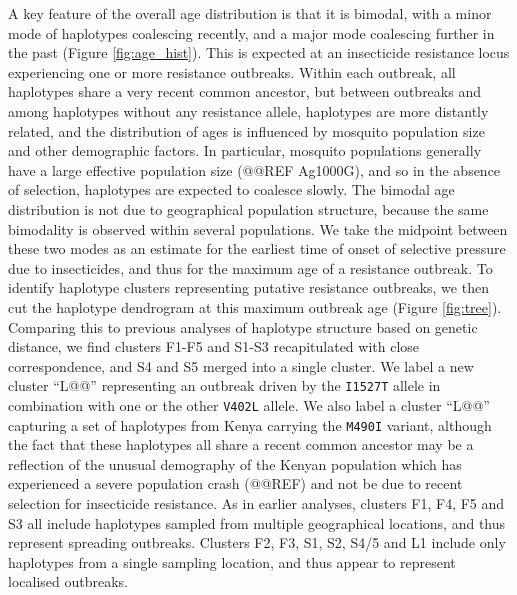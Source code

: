 \documentclass[a4paper,11pt,abstracton,hidelinks]{scrartcl}
\begin{document}
%
A key feature of the overall age distribution is that it is bimodal, with a minor mode of haplotypes coalescing recently, and a major mode coalescing further in the past (Figure \ref{fig:age_hist}).
%
This is expected at an insecticide resistance locus experiencing one or more resistance outbreaks.
%
Within each outbreak, all haplotypes share a very recent common ancestor, but between outbreaks and among haplotypes without any resistance allele, haplotypes are more distantly related, and the distribution of ages is influenced by mosquito population size and other demographic factors.
%
In particular, mosquito populations generally have a large effective population size (@@REF Ag1000G), and so in the absence of selection, haplotypes are expected to coalesce slowly.
%
The bimodal age distribution is not due to geographical population structure, because the same bimodality is observed within several populations.
%
We take the midpoint between these two modes as an estimate for the earliest time of onset of selective pressure due to insecticides, and thus for the maximum age of a resistance outbreak.
%
To identify haplotype clusters representing putative resistance outbreaks, we then cut the haplotype dendrogram at this maximum outbreak age (Figure \ref{fig:tree}).
%
Comparing this to previous analyses of haplotype structure based on genetic distance, we find clusters F1-F5 and S1-S3 recapitulated with close correspondence, and S4 and S5 merged into a single cluster.
%
We label a new cluster ``L@@'' representing an outbreak driven by the \texttt{I1527T} allele in combination with one or the other \texttt{V402L} allele.
%
We also label a cluster ``L@@'' capturing a set of haplotypes from Kenya carrying the \texttt{M490I} variant, although the fact that these haplotypes all share a recent common ancestor may be a reflection of the unusual demography of the Kenyan population which has experienced a severe population crash (@@REF) and not be due to recent selection for insecticide resistance.
%
As in earlier analyses, clusters F1, F4, F5 and S3 all include haplotypes sampled from multiple geographical locations, and thus represent spreading outbreaks.
%
Clusters F2, F3, S1, S2, S4/5 and L1 include only haplotypes from a single sampling location, and thus appear to represent localised outbreaks.
\end{document}
